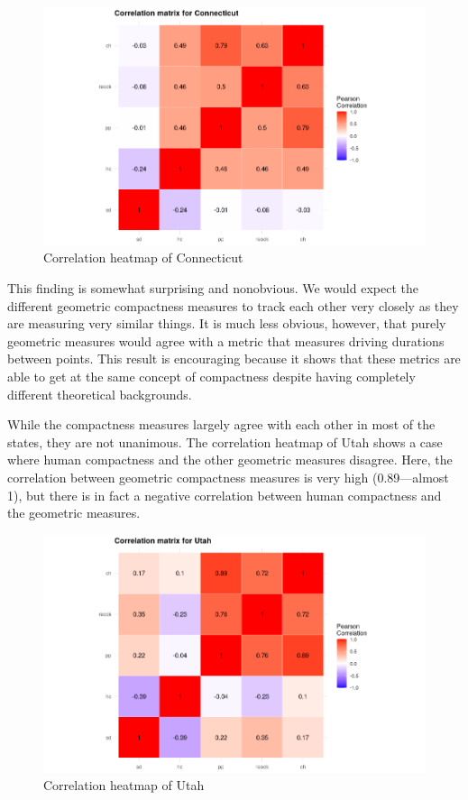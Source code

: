 \documentclass[]{article}
\begin{document}
\begin{figure}
\centering
\includegraphics{../30_results/corr_matrix_connecticut.png}
\caption{Correlation heatmap of Connecticut \label{connecticut_corr}}
\end{figure}

This finding is somewhat surprising and nonobvious. We would expect the
different geometric compactness measures to track each other very
closely as they are measuring very similar things. It is much less
obvious, however, that purely geometric measures would agree with a
metric that measures driving durations between points. This result is
encouraging because it shows that these metrics are able to get at the
same concept of compactness despite having completely different
theoretical backgrounds.

While the compactness measures largely agree with each other in most of
the states, they are not unanimous. The correlation heatmap of Utah
shows a case where human compactness and the other geometric measures
disagree. Here, the correlation between geometric compactness measures
is very high (0.89---almost 1), but there is in fact a negative
correlation between human compactness and the geometric measures.

\begin{figure}
\centering
\includegraphics{../30_results/corr_matrix_utah.png}
\caption{Correlation heatmap of Utah}
\end{figure}
\end{document}
